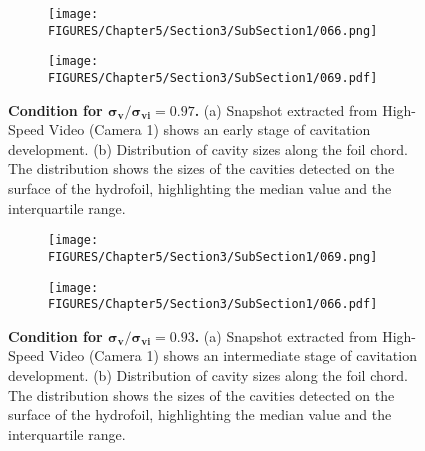 \begin{figure}[p]
    \centering
    \begin{subfigure}[b]{\textwidth}
        \centering
        \texttt{[image: FIGURES/Chapter5/Section3/SubSection1/066.png]}
        \captionsetup{justification=centering}
    \end{subfigure}
    \vspace{0.5cm} 
    \begin{subfigure}[b]{\textwidth}
        \centering
        \texttt{[image: FIGURES/Chapter5/Section3/SubSection1/069.pdf]}
        \captionsetup{justification=centering}
    \end{subfigure}
    \caption{\textbf{Condition for $\boldsymbol{\sigma_v / \sigma_{vi} = 0.97}$.} 
    (a) Snapshot extracted from High-Speed Video (Camera 1) shows an early stage of cavitation development.
    (b) Distribution of cavity sizes along the foil chord. The distribution shows the sizes of the cavities detected on the surface of the hydrofoil, highlighting the median value and the interquartile range.}
    \label{fig:069}
\end{figure}

\begin{figure}[p]
    \centering
    \begin{subfigure}[b]{\textwidth}
        \centering
        \texttt{[image: FIGURES/Chapter5/Section3/SubSection1/069.png]}
        \captionsetup{justification=centering}
    \end{subfigure}
    \vspace{0.5cm} 
    \begin{subfigure}[b]{\textwidth}
        \centering
        \texttt{[image: FIGURES/Chapter5/Section3/SubSection1/066.pdf]}
        \captionsetup{justification=centering}
    \end{subfigure}
    \caption{\textbf{Condition for $\boldsymbol{\sigma_v / \sigma_{vi} = 0.93}$.} 
    (a) Snapshot extracted from High-Speed Video (Camera 1) shows an intermediate stage of cavitation development.
    (b) Distribution of cavity sizes along the foil chord. The distribution shows the sizes of the cavities detected on the surface of the hydrofoil, highlighting the median value and the interquartile range.}
    \label{fig:066}
\end{figure}

